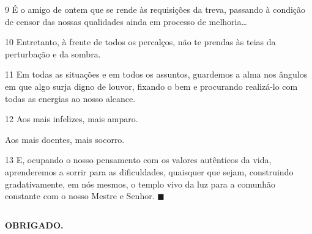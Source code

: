 \documentclass{rbfin}
\begin{document}
\begin{multicols}{2}
9 É o amigo de ontem que se rende às requisições da treva, passando à condição de censor das nossas qualidades ainda em processo de melhoria…

10 Entretanto, à frente de todos os percalços, não te prendas às teias da perturbação e da sombra.

11 Em todas as situações e em todos os assuntos, guardemos a alma nos ângulos em que algo surja digno de louvor, fixando o bem e procurando realizá-lo com todas as energias ao nosso alcance.

12 Aos mais infelizes, mais amparo.

Aos mais doentes, mais socorro.

13 E, ocupando o nosso pensamento com os valores autênticos da vida, aprenderemos a sorrir para as dificuldades, quaisquer que sejam, construindo gradativamente, em nós mesmos, o templo vivo da luz para a comunhão constante com o nosso Mestre e Senhor. $\blacksquare$
\end{multicols}

\newpage

$\,$

\vspace{75mm}

\begin{center}
\textbf{OBRIGADO.}
\end{center}
\end{document}

